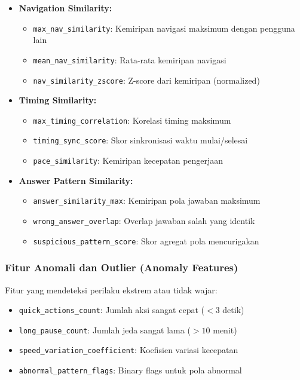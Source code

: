\begin{itemize}
    \item \textbf{Navigation Similarity:}
    \begin{itemize}
        \item \texttt{max\_nav\_similarity}: Kemiripan navigasi maksimum dengan pengguna lain
        \item \texttt{mean\_nav\_similarity}: Rata-rata kemiripan navigasi
        \item \texttt{nav\_similarity\_zscore}: Z-score dari kemiripan (normalized)
    \end{itemize}
    
    \item \textbf{Timing Similarity:}
    \begin{itemize}
        \item \texttt{max\_timing\_correlation}: Korelasi timing maksimum
        \item \texttt{timing\_sync\_score}: Skor sinkronisasi waktu mulai/selesai
        \item \texttt{pace\_similarity}: Kemiripan kecepatan pengerjaan
    \end{itemize}
    
    \item \textbf{Answer Pattern Similarity:}
    \begin{itemize}
        \item \texttt{answer\_similarity\_max}: Kemiripan pola jawaban maksimum
        \item \texttt{wrong\_answer\_overlap}: Overlap jawaban salah yang identik
        \item \texttt{suspicious\_pattern\_score}: Skor agregat pola mencurigakan
    \end{itemize}
\end{itemize}

\subsubsection{Fitur Anomali dan Outlier (Anomaly Features)}
\label{sec:fiturAnomali}

Fitur yang mendeteksi perilaku ekstrem atau tidak wajar:

\begin{itemize}
    \item \texttt{quick\_actions\_count}: Jumlah aksi sangat cepat ($<3$ detik)
    \item \texttt{long\_pause\_count}: Jumlah jeda sangat lama ($>10$ menit)
    \item \texttt{speed\_variation\_coefficient}: Koefisien variasi kecepatan
    \item \texttt{abnormal\_pattern\_flags}: Binary flags untuk pola abnormal
\end{itemize}

